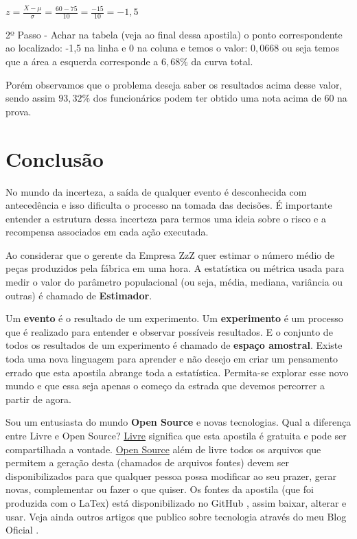 \documentclass[a4paper,11pt]{article}
\begin{document}
$z = \frac{X - \mu}{\sigma} = \frac{60 - 75}{10} = \frac{-15}{10} = -1,5$

2º Passo - Achar na tabela (veja ao final dessa apostila) o ponto correspondente ao localizado: -1,5 na linha e 0 na coluna e temos o valor: $0,0668$ ou seja temos que a área a esquerda corresponde a $6,68\%$ da curva total. 

Porém observamos que o problema deseja saber os resultados acima desse valor, sendo assim $93,32\%$ dos funcionários podem ter obtido uma nota acima de 60 na prova.

\section{Conclusão}
No mundo da incerteza, a saída de qualquer evento é desconhecida com antecedência e isso dificulta o processo na tomada das decisões. É importante entender a estrutura dessa incerteza para termos uma ideia sobre o risco e a recompensa associados em cada ação executada. 

Ao considerar que o gerente da Empresa ZzZ quer estimar o número médio de peças produzidos pela fábrica em uma hora. A estatística ou métrica usada para medir o valor do parâmetro populacional (ou seja, média, mediana, variância ou outras) é chamado de \textbf{Estimador}.

Um \textbf{evento} é o resultado de um experimento. Um \textbf{experimento} é um processo que é realizado para entender e observar possíveis resultados. E o conjunto de todos os resultados de um experimento é chamado de \textbf{espaço amostral}. Existe toda uma nova linguagem para aprender e não desejo em criar um pensamento errado que esta apostila abrange toda a estatística. Permita-se explorar esse novo mundo e que essa seja apenas o começo da estrada que devemos percorrer a partir de agora. 

Sou um entusiasta do mundo \textbf{Open Source} e novas tecnologias. Qual a diferença entre Livre e Open Source? \underline{Livre} significa que esta apostila é gratuita e pode ser compartilhada a vontade. \underline{Open Source} além de livre todos os arquivos que permitem a geração desta (chamados de arquivos fontes) devem ser disponibilizados para que qualquer pessoa possa modificar ao seu prazer, gerar novas, complementar ou fazer o que quiser. Os fontes da apostila (que foi produzida com o LaTex) está disponibilizado no GitHub \cite{github}, assim baixar, alterar e usar. Veja ainda outros artigos que publico sobre tecnologia através do meu Blog Oficial \cite{fernandoanselmo}.
\end{document}
